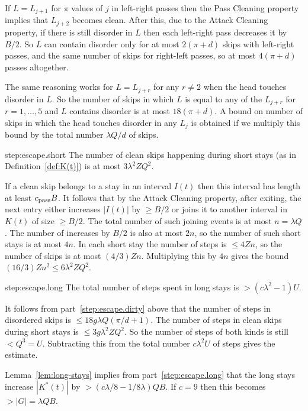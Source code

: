 \documentclass[11pt]{memoir}
\theoremstyle{definition} %
\renewcommand{\le}{\leq}
\renewcommand{\ge}{\geq}
\def\B{B}
\def\U{U}
\renewcommand{\d}{d}
\newcommand{\g}{g}
\newcommand{\passno}{\pi}
\newcommand{\Q}{Q} %
\newcommand{\Z}{Z} %
\newcommand{\cns}[1]{c_{\textrm{\upshape #1}}}
\newcommand{\CPass}{\cns{pass}}
\begin{document}
\begin{Proof}
\begin{pproof}
    If \( L=L_{j+1} \) for \( \passno \) values of \( j \) in left-right passes then the
    Pass Cleaning property implies that \( L_{j+2} \) becomes clean.
  After this, due to the Attack Cleaning property, if there is still disorder in \( L \) then
  each left-right pass decreases it by \( \B/2 \).
  So \( L \) can contain disorder only for at most \( 2(\passno + \d) \) skips with left-right passes,
  and the same number of skips for right-left passes, so at most \( 4(\passno+\d) \) passes altogether.

  The same reasoning works for \( L=L_{j+r} \) for any \( r\ne 2 \) when the head touches disorder in \( L \).
  So the number of skips in which \( L \) is equal to any of the \( L_{j+r} \) for \( r=1,\dots,5 \) and
  \( L \) contains disorder is at most \( 18(\passno+\d) \).
  A bound on number of skips in which the head touches disorder in any \( L_{j} \) is obtained if we multiply this
  bound by the total number \( \lambda\Q/\d \) of skips.
\end{pproof} %
\begin{step+}{step:escape.short}
  The number of clean skips happening during short stays (as in Definition~\ref{def:K(t)}) is
  at most \( 3\lambda^{2}\Z\Q^{2} \).
\end{step+}
\begin{pproof}
  If a clean skip belongs to a stay in an interval \( I(t) \) then this interval has length at least
  \( \CPass\B \).
  It follows that by the Attack Cleaning property, after exiting, the next entry either increases \( |I(t)| \) by
  \( \ge\B/2 \) or joins it to another interval in \( K(t) \) of size \( \ge\B/2 \).
  The total number of such joining events is at most \( n = \lambda\Q \).
  The number of increases by \( \B/2 \) is also at most \( 2n \), so the number of
  such short stays is at most \( 4n \).
  In each short stay the number of steps is \( \le 4\Z n \), so the number of skips is at most
  \( (4/3)\Z n \).
  Multiplying this by \( 4 n \) gives the bound \( (16/3)\Z n^{2} \le 6\lambda^{2}\Z\Q^{2} \).
\end{pproof} %
\begin{step+}{step:escape.long}
The total number of steps spent in long stays is \( >(c\lambda^{2} -1)\U \).
\end{step+}
\begin{pproof}
  It follows from part~\ref {step:escape.dirty} above that
  the number of steps in  disordered skips is \(  \le  18\g\lambda\Q(\passno/d+1) \).
  The number of steps in clean skips during short stays is \( \le 3\g\lambda^{2}\Z\Q^{2} \).
  So the number of steps of both kinds is still \( <\Q^{3}=\U \).
  Subtracting this from the total number \( c\lambda^{2}\U \)  of steps gives the estimate.
\end{pproof} %
Lemma~\ref{lem:long-stays} implies from part~\ref{step:escape.long}
that the long stays increase \( |K^{*}(t)| \) by \( >(c\lambda/8 - 1/8\lambda)\Q\B \).
If \( c=9 \) then this becomes \( >|G|=\lambda\Q\B \).
\end{Proof}
\end{document}
